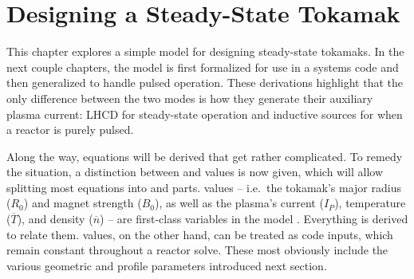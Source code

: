 %
%
%
%
%
%
%
%

\chapter{Designing a Steady-State Tokamak}

This chapter explores a simple model for designing steady-state tokamaks. In the next couple chapters, the model is first formalized for use in a systems code and then generalized to handle pulsed operation. These derivations highlight that the only difference between the two modes  is how they generate their auxiliary plasma current: LHCD for steady-state operation and inductive sources for when a reactor is purely pulsed.

Along the way, equations will be derived that get rather complicated. To remedy the situation, a distinction between  and  values is now given, which will allow splitting most equations into  and  parts.  values -- i.e.\ the tokamak's major radius ($R_0$) and magnet strength ($B_0$), as well as the plasma's current ($I_P$), temperature ($\overline T$), and density ($\overline n$) -- are first-class variables in the model . Everything is derived to relate them.  values, on the other hand, can be treated as code inputs, which remain constant throughout a reactor solve.  These most obviously include the various geometric and profile parameters introduced next section. 


